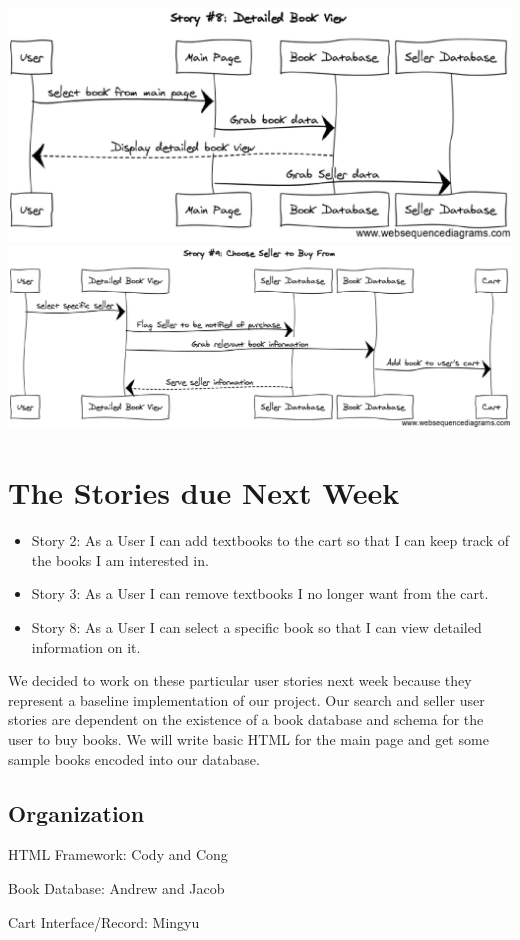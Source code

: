 \documentclass[12pt]{article}
\begin{document}
 		\clearpage
 		\includegraphics[width=16cm]{story8.eps}
 		\clearpage
 		\includegraphics[width=17cm]{story9.eps}

	\section{The Stories due Next Week}
		\begin{itemize}
		\item Story 2: As a User I can add textbooks to the cart so that I can keep track of the books I am interested in.

		\item Story 3: As a User I can remove textbooks I no longer want from the cart.

		\item Story 8: As a User I can select a specific book so that I can view detailed information on it.
		\end{itemize}
		We decided to work on these particular user stories next week because they represent a baseline implementation of our project. 
		Our search and seller user stories are dependent on the existence of a book database and schema for the user to buy books. 
		We will write basic HTML for the main page and get some sample books encoded into our database.
		\subsection{Organization}
		HTML Framework: Cody and Cong \par
		Book Database: Andrew and Jacob \par
		Cart Interface/Record: Mingyu \par
\end{document}
